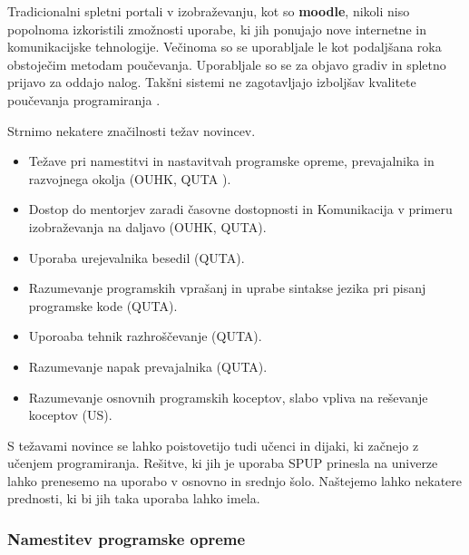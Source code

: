 

Tradicionalni spletni portali v izobraževanju, kot so \textbf{moodle},
nikoli niso popolnoma izkoristili zmožnosti uporabe, ki jih ponujajo
nove internetne in komunikacijske tehnologije. Večinoma so se
uporabljale le kot podaljšana roka obstoječim metodam
poučevanja. Uporabljale so se za objavo gradiv in spletno prijavo za
oddajo nalog. Takšni sistemi ne zagotavljajo izboljšav kvalitete
poučevanja programiranja \cite{ITaLCP_DistanceEdu}.

Strnimo nekatere značilnosti težav novincev.

\begin{itemize}
\tightlist
\item Težave pri namestitvi in nastavitvah programske opreme,
  prevajalnika in razvojnega okolja (OUHK, QUTA ).
\item Dostop do mentorjev zaradi časovne dostopnosti in Komunikacija v
  primeru izobraževanja na daljavo (OUHK, QUTA).
\item Uporaba urejevalnika besedil (QUTA).
\item Razumevanje programskih vprašanj in uprabe sintakse jezika pri
  pisanj programske kode (QUTA).
\item Uporoaba tehnik razhroščevanje (QUTA).
\item Razumevanje napak prevajalnika (QUTA).
\item Razumevanje osnovnih programskih koceptov, slabo vpliva na
  reševanje koceptov (US).
\end{itemize}

S težavami novince se lahko poistovetijo tudi učenci in dijaki, ki začnejo z
učenjem programiranja. Rešitve, ki jih je uporaba SPUP prinesla na
univerze lahko prenesemo na uporabo v osnovno in srednjo
šolo. Naštejemo lahko nekatere prednosti, ki bi jih taka uporaba lahko
imela.

\subsubsection{Namestitev programske opreme}
\label{sec:Namestitev_programske_opreme}


